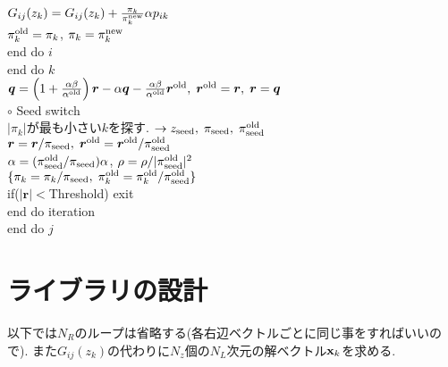 \documentclass[12pt,titlepage]{jarticle}
\begin{document}
$G_{i j}(z_k) = G_{i j}(z_k) + \frac{\pi_k}{\pi_k^{\rm new}} \alpha p_{i k}$
\\\hspace{2.0cm}
$\pi_k^{\rm old} = \pi_k$, $\pi_k = \pi_k^{\rm new}$
\\\hspace{1.5cm}
end do $i$
\\\hspace{1.0cm}
end do $k$
\\\hspace{1.0cm}
${\boldsymbol q} = \left( 1 + \frac{\alpha \beta}{\alpha^{\rm old}} \right) {\boldsymbol r}
- \alpha {\boldsymbol q} - \frac{\alpha \beta}{\alpha^{\rm old}} {\boldsymbol r}^{\rm old},\; 
{\boldsymbol r}^{\rm old} = {\boldsymbol r},\; {\boldsymbol r} = {\boldsymbol q}$
\\\hspace{1.0cm}
$\circ$ Seed switch
\\\hspace{1.0cm}
$|\pi_k|$が最も小さい$k$を探す. 
$\rightarrow z_{\rm seed},\; \pi_{\rm seed},\; \pi_{\rm seed}^{\rm old} $
\\\hspace{1.0cm}
${\boldsymbol r} = {\boldsymbol r} / \pi_{\rm seed},\; 
{\boldsymbol r}^{\rm old} = {\boldsymbol r}^{\rm old} / \pi_{\rm seed}^{\rm old}$
\\\hspace{1.0cm}
$\alpha = (\pi_{\rm seed}^{\rm old} / \pi_{\rm seed}) \alpha$,
$\rho = \rho / |\pi_{\rm seed}^{\rm old}|^2$
\\\hspace{1.0cm}
$\{\pi_k = \pi_k/\pi_{\rm seed},\; \pi_k^{\rm old} = \pi_k^{\rm old}/\pi_{\rm seed}^{\rm old}\}$
\\\hspace{1.0cm}
if($|{\boldsymbol r}| < $Threshold) exit
\\\hspace{0.5cm}
end do iteration
\\
end do $j$

\section{ライブラリの設計}

以下では$N_R$のループは省略する(各右辺ベクトルごとに同じ事をすればいいので).
また$G_{i j}(z_k)$の代わりに$N_z$個の$N_L$次元の解ベクトル${\bf x}_{k}$を求める.
\end{document}

